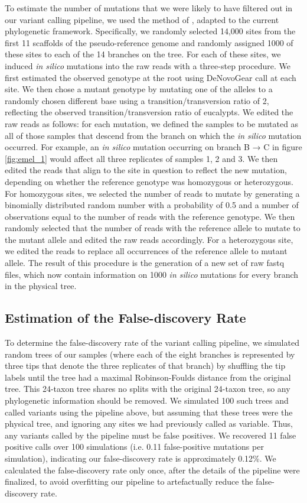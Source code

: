 To estimate the number of mutations that we were likely to have filtered out in our variant calling pipeline, we used the method of \textcite{ness_estimate_2012}, adapted to the current phylogenetic framework. Specifically, we randomly selected 14,000 sites from the first 11 scaffolds of the pseudo-reference genome and randomly assigned 1000 of these sites to each of the 14 branches on the tree. For each of these sites, we induced \textit{in silico} mutations into the raw reads with a three-step procedure. We first estimated the observed genotype at the root using DeNovoGear call at each site. We then chose a mutant genotype by mutating one of the alleles to a randomly chosen different base using a transition/transversion ratio of 2, reflecting the observed transition/transversion ratio of eucalypts. We edited the raw reads as follows: for each mutation, we defined the samples to be mutated as all of those samples that descend from the branch on which the \textit{in silico} mutation occurred. For example, an \textit{in silico} mutation occurring on branch B → C in figure \ref{fig:emel_1} would affect all three replicates of samples 1, 2 and 3. We then edited the reads that align to the site in question to reflect the new mutation, depending on whether the reference genotype was homozygous or heterozygous. For homozygous sites, we selected the number of reads to mutate by generating a binomially distributed random number with a probability of 0.5 and a number of observations equal to the number of reads with the reference genotype. We then randomly selected that the number of reads with the reference allele to mutate to the mutant allele and edited the raw reads accordingly. For a heterozygous site, we edited the reads to replace all occurrences of the reference allele to mutant allele. The result of this procedure is the generation of a new set of raw fastq files, which now contain information on 1000 \textit{in silico} mutations for every branch in the physical tree.

\subsection{Estimation of the False-discovery Rate}

To determine the false-discovery rate of the variant calling pipeline, we simulated random trees of our samples (where each of the eight branches is represented by three tips that denote the three replicates of that branch) by shuffling the tip labels until the tree had a maximal Robinson-Foulds distance from the original tree. This 24-taxon tree shares no splits with the original 24-taxon tree, so any phylogenetic information should be removed. We simulated 100 such trees and called variants using the pipeline above, but assuming that these trees were the physical tree, and ignoring any sites we had previously called as variable. Thus, any variants called by the pipeline must be false positives. We recovered 11 false positive calls over 100 simulations (i.e. 0.11 false-positive mutations per simulation), indicating our false-discovery rate is approximately 0.12\%. We calculated the false-discovery rate only once, after the details of the pipeline were finalized, to avoid overfitting our pipeline to artefactually reduce the false-discovery rate.


